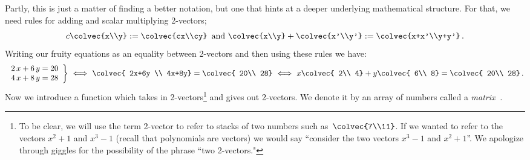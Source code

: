 %
Partly, this is just a matter of finding a better notation, but one that hints at a deeper underlying mathematical structure.
For that, we need rules for adding and scalar multiplying 2-vectors; 
\[
c\colvec{x\\y}:=\colvec{cx\\cy}\, \mbox{ and } \colvec{x\\y}+\colvec{x'\\y'}:=\colvec{x+x'\\y+y'}\, .
\]
Writing our fruity equations as an equality between 2-vectors and then using these rules we have:
\begin{equation*}
   \left.
\begin{array}{lr}
   	2\, x + 6\, y  =  20 \\
	4\, x + 8\, y  =  28
     \end{array}
   \right\} 
\ \Longleftrightarrow  \  \colvec{ 2x+6y \\ 4x+8y}  =\colvec{ 20\\ 28}
\ \Longleftrightarrow \ 
   x \colvec{ 2\\ 4} + y \colvec{ 6\\ 8} =\colvec{ 20\\ 28} \, .
\end{equation*}
Now we  introduce a function which takes in 2-vectors\footnote{To be clear, we will use the term 2-vector to refer to stacks of two numbers such as~$\colvec{7\\11}$. If we wanted to refer to the vectors $x^2+1$ and $x^3-1$ (recall that polynomials are vectors) we would say ``consider the two vectors $x^3-1$ and $x^2+1$''. We apologize through giggles for the possibility of the phrase ``two 2-vectors."} and gives out 2-vectors. We denote it by  an array of numbers  called a {\itshape matrix\,\! .}
